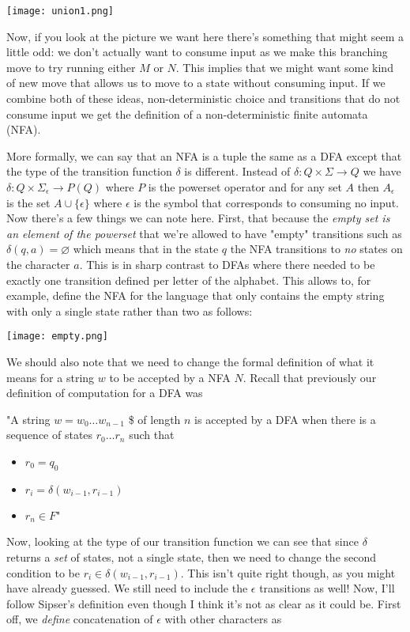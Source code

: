 \documentclass[11pt]{article}
\begin{document}
\texttt{[image: union1.png]}

Now, if you look at the picture we want here there's something that might seem a little odd: we don't actually want to consume input as we make this branching move to try running either $M$ or $N$. This implies that we might want some kind of new move that allows us to move to a state without consuming input. If we combine both of these ideas, non-deterministic choice and transitions that do not consume input we get the definition of a non-deterministic finite automata (NFA). 

More formally, we can say that an NFA is a tuple the same as a DFA except that the type of the transition function $\delta$ is different. Instead of $\delta : Q \times \Sigma \to Q$ we have $\delta : Q \times \Sigma_{\epsilon} \to P(Q)$ where $P$ is the powerset operator and for any set $A$ then $A_{\epsilon}$ is the set $A \cup \{\epsilon\}$ where $\epsilon$ is the symbol that corresponds to consuming no input. Now there's a few things we can note here. First, that because the \emph{empty set is an element of the powerset} that we're allowed to have "empty" transitions such as $\delta(q,a) = \varnothing$ which means that in the state $q$ the NFA transitions to \emph{no} states on the character $a$. This is in sharp contrast to DFAs where there needed to be exactly one transition defined per letter of the alphabet. This allows to, for example, define the NFA for the language that only contains the empty string with only a single state rather than two as follows:

\texttt{[image: empty.png]}

We should also note that we need to change the formal definition of what it means for a string $w$ to be accepted by a NFA $N$. Recall that previously our definition of computation for a DFA was 

"A string $w = w_0 \ldots w_{n-1}$ \$ of length $n$ is accepted by a DFA when there is a sequence of states $r_0 \ldots r_n$ such that 
\begin{itemize}
\item $r_0 = q_0$
\item $r_i = \delta (w_{i-1},r_{i-1})$
\item $r_n \in F$"
\end{itemize}

Now, looking at the type of our transition function we can see that since $\delta$ returns a \emph{set} of states, not a single state, then we need to change the second condition to be $r_i \in \delta (w_{i-1},r_{i-1})$. This isn't quite right though, as you might have already guessed. We still need to include the $\epsilon$ transitions as well! Now, I'll follow Sipser's definition even though I think it's not as clear as it could be. First off, we \emph{define} concatenation of $\epsilon$ with other characters as
\end{document}
